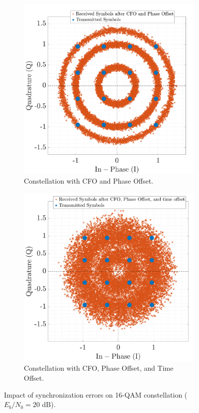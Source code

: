 \documentclass[11pt]{article}
\begin{document}
	\begin{figure}[H]
		\centering
		\begin{subfigure}[t]{0.4\textwidth}
			\centering
			\includegraphics[width=\linewidth]{Images/cfo-po}
			\caption{Constellation with CFO and Phase Offset.}
			\label{fig:cfo-po-sub_compact}
		\end{subfigure}
		\hfill
		\begin{subfigure}[t]{0.4\textwidth}
			\centering
			\includegraphics[width=\linewidth]{Images/cfo-po-to}
			\caption{Constellation with CFO, Phase Offset, and Time Offset.}
			\label{fig:cfo-po-to-sub_compact}
		\end{subfigure}
		\caption{Impact of synchronization errors on 16-QAM constellation ($E_b/N_0 = 20 \text{ dB}$).}
		\label{fig:const_sync_errors}
	\end{figure}
	
\end{document}
